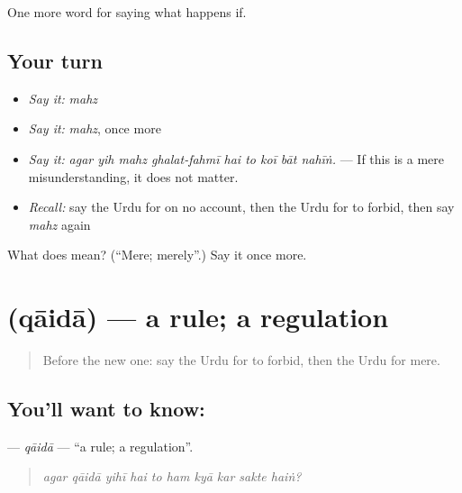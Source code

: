\begin{grammarlens}[title={What you've built}]
One more word for saying what happens if.
\end{grammarlens}

\subsection*{Your turn}
\begin{itemize}
\raggedright
  \item \emph{Say it:} \emph{mahz}
  \item \emph{Say it:} \emph{mahz}, once more
  \item \emph{Say it:} \emph{agar yih mahz ghalat-fahmī hai to koī bāt nahīṅ.} — If this is a mere misunderstanding, it does not matter.
  \item \emph{Recall:} say the Urdu for on no account, then the Urdu for to forbid, then say \emph{mahz} again
\end{itemize}

\begin{tcolorbox}[breakable,colback=teal!4,colframe=teal!35!black,title={Before you move on}]
What does  mean? (\textquotedblleft{}Mere; merely\textquotedblright{}.) Say it once more.
\end{tcolorbox}
\section[\texorpdfstring{\ur{قاعدہ} (qāidā)}{قاعدہ (qāidā)}]{ (qāidā) — a rule; a regulation}

\label{lesson:UR-C367-qaida}



\begin{quote}
Before the new one: say the Urdu for to forbid, then the Urdu for mere.
\end{quote}

\subsection*{You'll want to know: }
\textbf{} — \emph{qāidā} — \textquotedblleft{}a rule; a regulation\textquotedblright{}.

\begin{quote}
         
\end{quote}

\begin{quote}
\emph{agar qāidā yihī hai to ham kyā kar sakte haiṅ?}
\end{quote}


